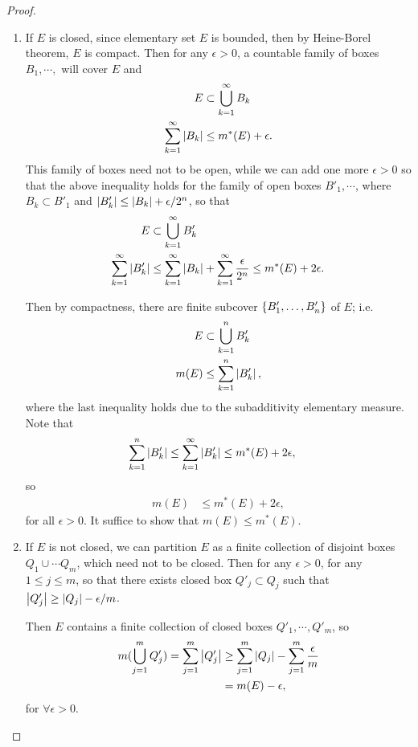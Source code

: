 \documentclass[11pt]{article}
\begin{document}
\begin{itemize}
\begin{proof}
\begin{enumerate}
\item If $E$ is closed, since elementary set $E$ is bounded, then by Heine-Borel theorem, $E$ is compact. Then for any $\epsilon>0$, a countable family of boxes $B_{1}, \cdots,$ will cover $E$ and 
\begin{align*}
E &\subset \bigcup_{k=1}^{\infty}B_{k}\\
\sum_{k=1}^{\infty}\left\lvert B_{k} \right\rvert &\le m^{*}(E)+ \epsilon.
\end{align*}
This family of boxes need not to be open, while we can add one more $\epsilon>0$ so that the above inequality holds for the family of open boxes $B'_{1}, \cdots$, where $B_{k}\subset B'_{1}$ and $\left\lvert B'_{k} \right\rvert\le \left\lvert B_{k} \right\rvert + \epsilon/2^{n}$, so that 
\begin{align*}
E &\subset \bigcup_{k=1}^{\infty}B'_{k}\\
\sum_{k=1}^{\infty}\left\lvert B'_{k} \right\rvert &\le \sum_{k=1}^{\infty}\left\lvert B_{k} \right\rvert+ \sum_{k=1}^{\infty}\frac{\epsilon}{2^{n}}  \le m^{*}(E)+ 2\epsilon.
\end{align*} 
 
Then by compactness, there are finite subcover $\left\{B'_{1}, \ldots, B'_{n}\right\}$ of $E$; i.e. 
\begin{align*}
E &\subset \bigcup_{k=1}^{n}B'_{k}\\
m(E) &\le \sum_{k=1}^{n}\left\lvert B'_{k} \right\rvert,
\end{align*} where the last inequality holds due to the subadditivity elementary measure. 
Note that
\begin{align*}
\sum_{k=1}^{n}\left\lvert B'_{k} \right\rvert\le  \sum_{k=1}^{\infty}\left\lvert B'_{k} \right\rvert&\le m^{*}(E)+ 2\epsilon,
\end{align*}
so
\begin{align*}
m(E) &\le m^{*}(E)+ 2\epsilon,
\end{align*}
for all $\epsilon>0$. It suffice to show that $m(E) \le m^{*}(E)$.

\item If $E$ is not closed, we can partition $E$ as a finite collection of disjoint boxes $Q_{1}\cup\cdots Q_{m}$, which need not to be closed. Then for any $\epsilon>0$, for any $1\le j\le m$, so that there exists closed box $Q'_{j} \subset Q_{j}$ such that $\left\lvert Q'_{j} \right\rvert \ge \left\lvert Q_{j} \right\rvert- \epsilon/m$.

Then $E$ contains a finite collection of closed boxes $Q'_{1}, \cdots, Q'_{m}$, so 
\begin{align*}
m(\bigcup_{j=1}^{m}Q'_{j})=\sum_{j=1}^{m}\left\lvert Q'_{j} \right\rvert &\ge \sum_{j=1}^{m}\left\lvert Q_{j} \right\rvert- \sum_{j=1}^{m}\frac{\epsilon}{m}\\
&= m(E)- \epsilon,
\end{align*}
for $\forall \epsilon>0$.


\end{enumerate}
\end{proof}
\end{itemize}
\end{document}
